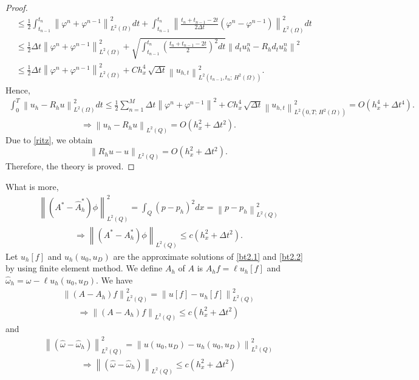 \documentclass[]{article}
\begin{document}
\begin{proof}
\begin{align*}
		&\leq\frac{1}{2}\int_{t_{n-1}}^{t_n}\left\|\varphi^n+\varphi^{n-1}\right\|_{L^2(\Omega)}^2dt+\int_{t_{n-1}}^{t_n}\left\|\frac{t_n+t_{n-1}-2t}{2\Delta t}\left(\varphi^n-\varphi^{n-1}\right)\right\|_{L^2(\Omega)}^2dt\\
		&\leq\frac{1}{2}\Delta t\left\|\varphi^n+\varphi^{n-1}\right\|_{L^2(\Omega)}^2+\sqrt{\int_{t_{n-1}}^{t_n}\left(\frac{t_n+t_{n-1}-2t}{2}\right)^2dt}\left\|d_tu_h^n-R_hd_tu_h^n\right\|^2\\
		&\leq\frac{1}{2}\Delta t\left\|\varphi^n+\varphi^{n-1}\right\|_{L^2(\Omega)}^2+Ch_x^4\,\sqrt{\Delta t}\left\|u_{h, t}\right\|_{L^2\left(t_{n-1}, t_n;\, H^2(\Omega)\right)}^2.
	\end{align*}
	Hence,
	\begin{align*}
	\int_0^T\left\|u_h-R_hu\right\|_{L^2(\Omega)}^2dt\leq \frac{1}{2}\sum_{n=1}^{M}\Delta t\left\|\varphi^n+\varphi^{n-1}\right\|^2+Ch_x^4\,\sqrt{\Delta t}\left\|u_{h, t}\right\|_{L^2\left(0, T;\, H^2(\Omega)\right)}^2=O(h_x^4+\Delta t^4).
	\end{align*}
	$$\Rightarrow \left\|u_h-R_hu\right\|_{L^2(Q)}=O(h_x^2+\Delta t^2).$$
	Due to \eqref{ritz}, we obtain
	$$\left\|R_hu-u\right\|_{L^2(Q)}=O(h_x^2+\Delta t^2).$$
	Therefore, the theory is proved.
\end{proof}
\noindent What is more,
\begin{align*}
	\left\| \left(A^*-\hat{A}^*_h\right)\phi\right\|_{L^2(Q)}^2=\int_Q (p-p_h)^2dx=\left\| p-p_h\right\|_{L^2(Q)}^2
\end{align*}
\begin{align}\label{3.8}
	\Rightarrow \left\| \left(A^*-A^*_h\right)\phi\right\|_{L^2(Q)}\leq c(h_x^2+\Delta t^2).
\end{align}
Let $u_h[f]$ and $u_h(u_0, u_D)$ are the approximate solutions of \cref{bt2.1} and \cref{bt2.2} by using finite element method. We define $A_h$ of $A$ is $A_hf=\ell u_h[f]$ and $\hat{\omega}_h=\omega-\ell u_h(u_0, u_D)$. We have
\begin{align*}
	\left\| \left(A-A_h\right)f\right\|_{L^2(Q)}^2=\left\|  u[f]- u_h[f]\right\|_{L^2(Q)}^2
\end{align*}
\begin{align}\label{3.9}
	\Rightarrow\left\| \left(A-A_h\right)f\right\|_{L^2(Q)}\leq c(h_x^2+\Delta t^2)
\end{align}
and 
\begin{align*}
	\left\|\left(\hat{\omega}-\hat{\omega}_h\right)\right\|_{L^2(Q)}^2=\left\| u(u_0,u_D)-u_h(u_0, u_D)\right\|_{L^2(Q)}^2
\end{align*}
\begin{align}\label{3.10}
	\Rightarrow\left\|\left(\hat{\omega}-\hat{\omega}_h\right)\right\|_{L^2(Q)}\leq c(h_x^2+\Delta t^2)
\end{align}
\end{document}
